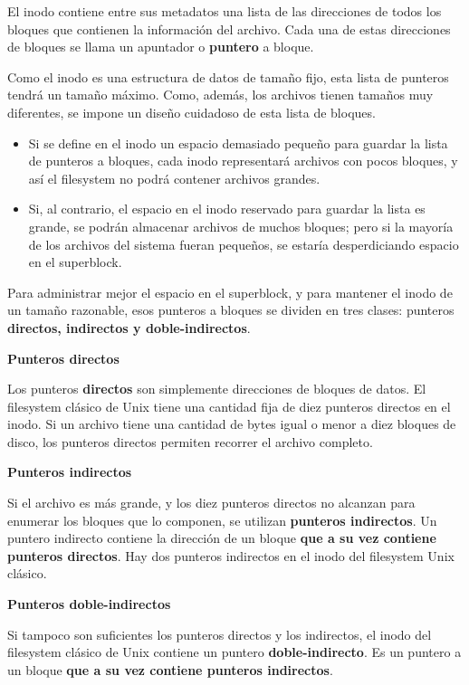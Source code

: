\documentclass[spanish,A4,]{article}
\begin{document}
El inodo contiene entre sus metadatos una lista de las direcciones de
todos los bloques que contienen la información del archivo. Cada una de
estas direcciones de bloques se llama un apuntador o \textbf{puntero} a
bloque.

Como el inodo es una estructura de datos de tamaño fijo, esta lista de
punteros tendrá un tamaño máximo. Como, además, los archivos tienen
tamaños muy diferentes, se impone un diseño cuidadoso de esta lista de
bloques.

\begin{itemize}
\itemsep1pt\parskip0pt
\item
  Si se define en el inodo un espacio demasiado pequeño para guardar la
  lista de punteros a bloques, cada inodo representará archivos con
  pocos bloques, y así el filesystem no podrá contener archivos grandes.
\item
  Si, al contrario, el espacio en el inodo reservado para guardar la
  lista es grande, se podrán almacenar archivos de muchos bloques; pero
  si la mayoría de los archivos del sistema fueran pequeños, se estaría
  desperdiciando espacio en el superblock.
\end{itemize}

Para administrar mejor el espacio en el superblock, y para mantener el
inodo de un tamaño razonable, esos punteros a bloques se dividen en tres
clases: punteros \textbf{directos, indirectos y doble-indirectos}.

\textbf{Punteros directos}

Los punteros \textbf{directos} son simplemente direcciones de bloques de
datos. El filesystem clásico de Unix tiene una cantidad fija de diez
punteros directos en el inodo. Si un archivo tiene una cantidad de bytes
igual o menor a diez bloques de disco, los punteros directos permiten
recorrer el archivo completo.

\textbf{Punteros indirectos}

Si el archivo es más grande, y los diez punteros directos no alcanzan
para enumerar los bloques que lo componen, se utilizan \textbf{punteros
indirectos}. Un puntero indirecto contiene la dirección de un bloque
\textbf{que a su vez contiene punteros directos}. Hay dos punteros
indirectos en el inodo del filesystem Unix clásico.

\textbf{Punteros doble-indirectos}

Si tampoco son suficientes los punteros directos y los indirectos, el
inodo del filesystem clásico de Unix contiene un puntero
\textbf{doble-indirecto}. Es un puntero a un bloque \textbf{que a su vez
contiene punteros indirectos}.
\end{document}
